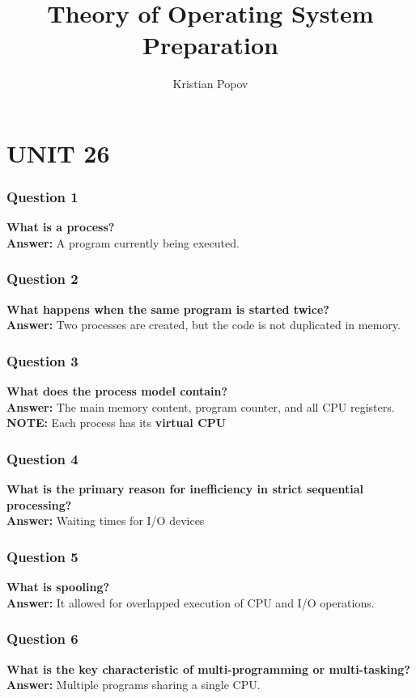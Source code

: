\documentclass{article}
\begin{document}
\title{Theory of Operating System Preparation}
\author{Kristian Popov}
\date{}
\maketitle

\section*{UNIT 26}

\subsubsection*{Question 1} 
\textbf{What is a process?} \\
\textbf{Answer:} A program currently being executed.

\subsubsection*{Question 2}
\textbf{What happens when the same program is started twice?} \\
\textbf{Answer:} Two processes are created, but the code is not duplicated in memory.

\subsubsection*{Question 3}
\textbf{What does the process model contain?} \\
\textbf{Answer:} The main memory content, program counter, and all CPU registers. \\
\textbf{NOTE:} Each process has its \textbf{virtual CPU}

\subsubsection*{Question 4}
\textbf{What is the primary reason for inefficiency in strict sequential processing?} \\
\textbf{Answer:} Waiting times for I/O devices

\subsubsection*{Question 5}
\textbf{What is spooling?} \\
\textbf{Answer:} It allowed for overlapped execution of CPU and I/O operations.

\subsubsection*{Question 6}
\textbf{What is the key characteristic of multi-programming or multi-tasking?} \\
\textbf{Answer:} Multiple programs sharing a single CPU.
\end{document}
